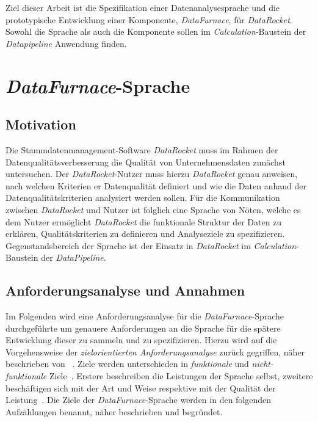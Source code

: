 \documentclass[
  language=german, %
  type=bachelor%
]{isthesis}
\begin{document}
\begin{content}
  Ziel dieser Arbeit ist die Spezifikation einer Datenanalysesprache und die
  prototypische Entwicklung einer Komponente, \textit{DataFurnace}, für
  \textit{DataRocket}. Sowohl die Sprache als auch die Komponente sollen im
  \textit{Calculation}-Baustein der \textit{Datapipeline} Anwendung finden.

  \chapter{\textit{DataFurnace}-Sprache}


  \section{Motivation}
  Die Stammdatenmanagement-Software \textit{DataRocket} muss im Rahmen der
  Datenqualitätsverbesserung die Qualität von Unternehmensdaten zunächst untersuchen. Der
  \textit{DataRocket}-Nutzer muss hierzu \textit{DataRocket} genau anweisen,
  nach welchen Kriterien er Datenqualität definiert und wie die Daten anhand
  der Datenqualitätskriterien analysiert werden sollen. Für die Kommunikation
  zwischen \textit{DataRocket} und Nutzer ist folglich eine Sprache von Nöten,
  welche es dem Nutzer ermöglicht \textit{DataRocket} die funktionale Struktur
  der Daten zu erklären, Qualitätskriterien zu definieren und Analyseziele zu
  spezifizieren. Gegenstandsbereich der Sprache ist der Einsatz in
  \textit{DataRocket} im \textit{Calculation}-Baustein der
  \textit{DataPipeline}.

  \section{Anforderungsanalyse und Annahmen}\label{sec:sprache/anforderungsanalyse}
  Im Folgenden wird eine Anforderungsanalyse für die
  \textit{DataFurnace}-Sprache durchgeführte um genauere Anforderungen an die
  Sprache für die spätere Entwicklung dieser zu sammeln und zu spezifizieren.
  Hierzu wird auf die Vorgehensweise der \textit{zielorientierten
  Anforderungsanalyse} zurück gegriffen, näher beschrieben von
  \textsc{\citeauthor{van2001goal}}~\citeyearpar{van2001goal}.
  Ziele werden unterschieden in \textit{funktionale} und
  \textit{nicht-funktionale} Ziele~\cite[][S.  36]{mylopoulos1999object}.
  Erstere beschreiben die Leistungen der Sprache selbst, zweitere beschäftigen
  sich mit der Art und Weise respektive mit der Qualität der Leistung~\cite[][S.
  250]{van2001goal}. Die Ziele der \textit{DataFurnace}-Sprache werden in den
  folgenden Aufzählungen benannt, näher beschrieben und begründet.


\end{content}
\end{document}
